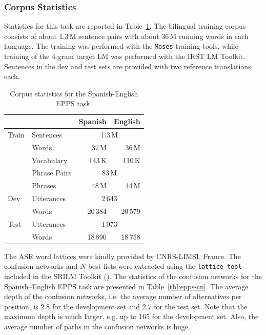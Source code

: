 \documentclass[10pt]{report}
\theoremstyle{plain}
\begin{document}
{\subsubsection{Corpus Statistics}
Statistics for this task are reported in Table~\ref{tbl:epps-corpstat}.  
The bilingual training corpus consists of about 1.3\,M sentence pairs with about 36\,M running words in each language.
The training was performed with the {\tt Moses} training tools, while training of the 4-gram target LM was performed with the IRST LM Toolkit.
Sentences in the dev and test sets are provided with two reference translations each.  
\begin{table}[t]
\begin{center}
\caption{Corpus statistics for the Spanish-English EPPS task.
} \label{tbl:epps-corpstat}
\begin{tabular}{|l|l|r|r|}
 \hline
       &              &  Spanish   &   English     \\
\hline
Train  & Sentences    & \multicolumn{2}{c|}{1.3\,M}\\
\cline{2-4}
      & Words & 37\,M & 36\,M\\
\cline{2-4}
       & Vocabulary   & 143\,K & 110\,K\\
\cline{2-4}
       & Phrase Pairs   & \multicolumn{2}{c|}{83\,M}\\
\cline{2-4}
       & Phrases   & 48\,M & 44\,M\\
 \hline
Dev    & Utterances    &   \multicolumn{2}{c|}{2\,643} \\
 \cline{2-4}
       & Words& 20\,384 & 20\,579 \\ 
 \hline
Test   & Utterances    & \multicolumn{2}{c|}{1\,073}  \\
 \cline{2-4}
       & Words& 18\,890 & 18\,758 \\
 \cline{2-4}
 \hline
\end{tabular}
\end{center}
\end{table}


The ASR word lattices  were  kindly provided by CNRS-LIMSI, France.
The confusion networks and $N$-best lists were extracted using the {\tt lattice-tool} included in the SRILM Toolkit (\cite{stolcke:02}). 
The statistics of the confusion networks for the Spanish--English EPPS task are presented in Table~\ref{tbl:epps-cn}.
The average depth of the confusion networks, i.e. the average number of alternatives per position, is 2.8 for the development set and 2.7 for the test set.
Note that the maximum depth is much larger, e.g. up to 165 for the development set.
Also, the average number of paths in the confusion networks is huge. 

}
\end{document}
